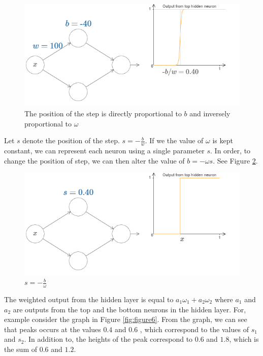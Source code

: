 \documentclass{article}
\begin{document}
\begin{figure}[H]
    \centering
    \includegraphics[width=0.8 \textwidth]{Images/2/3.png}
     \caption{The position of the step is directly proportional to $b$ and inversely proportional to $\omega$}
    \label{fig:figure4}
\end{figure}
Let  $s$ denote the position of the step. $ s = - \frac{b}{w} $. If we the value of $\omega$ is kept constant, we can represent each neuron using a single parameter $s$. In order, to change the position of step, we can then alter the value of $ b = -\omega s$. See Figure \ref{fig:figure5}.

\begin{figure}[H]
    \centering
    \includegraphics[width=0.8 \textwidth]{Images/2/4.png}
 
      \caption{$s = -\frac{b}{\omega}$}
    \label{fig:figure5}
\end{figure}

The weighted output from the hidden layer is equal to $a_1 \omega_1 + a_2 \omega_2 $ where $a_1$ and $a_2$ are outputs from the top and the bottom neurons in the hidden layer. For, example consider the graph in Figure \ref{fig:figure6}. From the graph, we can see that peaks occurs at the values $0.4$ and $0.6$ , which correspond to the values of $s_1$ and $s_2$. In addition to, the heights of the peak correspond to $0.6$ and $1.8$, which is the sum of $0.6$ and $1.2$.
\end{document}
